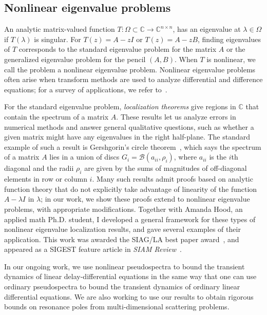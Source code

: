 \documentclass[11pt]{amsart}
\newcommand{\bbC}{\mathbb{C}}
\begin{document}
\subsection*{Nonlinear eigenvalue problems}
An analytic matrix-valued function
$T : \Omega \subset \bbC \rightarrow \bbC^{n \times n}$,
has an eigenvalue at $\lambda \in \Omega$ if $T(\lambda)$ is
singular.  For $T(z) = A-zI$ or $T(z) = A-zB$, finding eigenvalues
of $T$ corresponds to the standard eigenvalue problem for
the matrix $A$ or the generalized eigenvalue problem for the
pencil $(A,B)$.  When $T$ is nonlinear, we call the problem
a nonlinear eigenvalue problem.
Nonlinear eigenvalue problems often arise
when transform methods are used to analyze differential and
difference equations; for a survey of applications,
we refer to~\cite{2015-sirev,Mehrmann:2005:NEP}.

For the standard eigenvalue problem, {\em localization theorems} give
regions in $\bbC$ that contain the spectrum of a matrix $A$.  These
results let us analyze errors in numerical methods and answer general
qualitative questions, such as whether a given matrix might have any
eigenvalues in the right half-plane.  The standard example of such a
result is Gershgorin's circle
theorem~\cite{Varga:2004:GAC,Stewart:1990:MPT}, which says the spectrum
of a matrix $A$ lies in a union of discs $G_i = \mathcal{B}(a_{ii},
\rho_i)$, where $a_{ii}$ is the $i$th diagonal and the radii $\rho_i$
are given by the sums of magnitudes of off-diagonal elements in row or
column $i$.  Many such results admit proofs based on analytic function
theory that do not explicitly take advantage of linearity of the
function $A-\lambda I$ in $\lambda$; in our work, we show these proofs
extend to nonlinear eigenvalue problems, with appropriate modifications.
Together with Amanda Hood, an applied math Ph.D. student, I developed a
general framework for these types of nonlinear eigenvalue localization
results, and gave several examples of their application.  This work was
awarded the SIAG/LA best paper award~\cite{2013-simax}, and appeared as
a SIGEST feature article in {\em SIAM Review}~\cite{2015-sirev}.

In our ongoing work, we use nonlinear pseudospectra to bound the
transient dynamics of linear delay-differential equations in the same
way that one can use ordinary pseudospectra to bound the transient
dynamics of ordinary linear differential equations.  We are also working
to use our results to obtain rigorous bounds on resonance poles from
multi-dimensional scattering problems.
\end{document}
